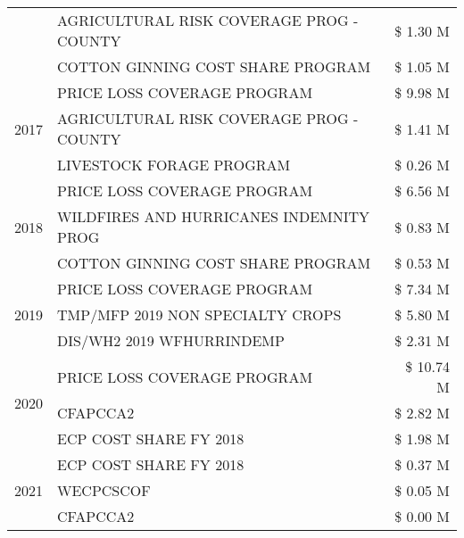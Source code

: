 \begin{tabular}{llr}
 & AGRICULTURAL RISK COVERAGE PROG - COUNTY      & \$ 1.30 M \\
 & COTTON GINNING COST SHARE PROGRAM             & \$ 1.05 M \\
\cline{1-3}
\multirow[t]{3}{*}{2017} & PRICE LOSS COVERAGE PROGRAM & \$ 9.98 M \\
 & AGRICULTURAL RISK COVERAGE PROG - COUNTY & \$ 1.41 M \\
 & LIVESTOCK FORAGE PROGRAM & \$ 0.26 M \\
\cline{1-3}
\multirow[t]{3}{*}{2018} & PRICE LOSS COVERAGE PROGRAM & \$ 6.56 M \\
 & WILDFIRES AND HURRICANES INDEMNITY PROG & \$ 0.83 M \\
 & COTTON GINNING COST SHARE PROGRAM & \$ 0.53 M \\
\cline{1-3}
\multirow[t]{3}{*}{2019} & PRICE LOSS COVERAGE PROGRAM & \$ 7.34 M \\
 & TMP/MFP 2019 NON SPECIALTY CROPS & \$ 5.80 M \\
 & DIS/WH2 2019 WFHURRINDEMP & \$ 2.31 M \\
\cline{1-3}
\multirow[t]{3}{*}{2020} & PRICE LOSS COVERAGE PROGRAM & \$ 10.74 M \\
 & CFAPCCA2 & \$ 2.82 M \\
 & ECP COST SHARE FY 2018 & \$ 1.98 M \\
\cline{1-3}
\multirow[t]{3}{*}{2021} & ECP COST SHARE FY 2018 & \$ 0.37 M \\
 & WECPCSCOF & \$ 0.05 M \\
 & CFAPCCA2 & \$ 0.00 M \\
\cline{1-3}
\bottomrule
\end{tabular}
